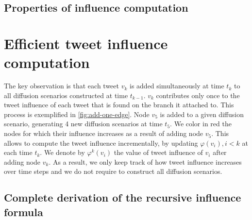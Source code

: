 \subsection{Properties of influence computation}

\section{Efficient tweet influence computation}
\label{si-sec:efficient-algo}

The key observation is that each tweet $v_k$ is added simultaneously at time $t_k$ to all diffusion scenarios constructed at time $t_{k-1}$.
$v_k$ contributes only once to the tweet influence of each tweet that is found on the branch it attached to.
This process is exemplified in \cref{fig:add-one-edge}.
Node $v_5$ is added to a given diffusion scenario, generating 4 new diffusion scenarios at time $t_5$.
We color in red the nodes for which their influence increases as a result of adding node $v_5$.
%
This allows to compute the tweet influence incrementally, by updating $\varphi(v_i), i < k$ at each time $t_k$.
We denote by $\varphi^k(v_i)$ the value of tweet influence of $v_i$ after adding node $v_k$.
As a result, we only keep track of how tweet influence increases over time steps and we do not require to construct all diffusion scenarios.

\subsection{Complete derivation of the recursive influence formula}


